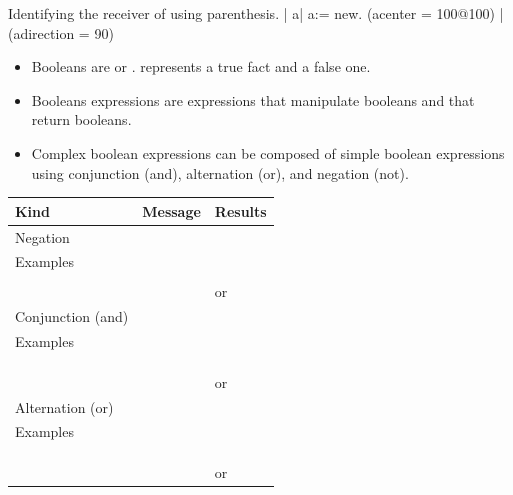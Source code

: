\begin{scriptwithtitle}{Identifying the receiver of \ct{$\mid$} using parenthesis.}\label{src:goodalternative}
| a\Turtle |
a\Turtle := \Turtle new.
(a\Turtle center = 100@100) | (a\Turtle direction = 90)
\end{scriptwithtitle}




\summa

\begin{itemize}
\item 
Booleans are  or .  represents a true fact and  a false one.

\item Booleans expressions are expressions that manipulate booleans and that return booleans. 

\item Complex boolean expressions can be composed of simple boolean expressions using conjunction (and), alternation (or), and negation (not). 
\end{itemize}

\begin{center}
\begin{tabular}{| p{2cm}|p{10cm} | p{2cm}|} \hline
Kind& Message&Results \\ \hline \hline

Negation&\ct{not }&\\ \hline
Examples&\ct{false not}&\ct{true}\\ \hline
&\ct{true not}& \ct{false}\\ \hline
&\ct{(a\Turtle color = Color red) not}&\ct{true} or \ct{false}\\ \hline \hline

Conjunction (and) &\ct{\&}&\\ \hline
Examples&\ct{true \& true}&\ct{true}\\  \hline
&\ct{false \& true}&\ct{false}\\  \hline
&\ct{true \& false}&\ct{false}\\  \hline
&\ct{false \& false}&\ct{false}\\ \hline
&\ct{(a\Turtle center = 100@100) \& (a\Turtle direction = 90)}&\ct{true} or \ct{false}\\ \hline \hline

Alternation (or) &\ct{$\mid$}&\\ \hline
Examples&\ct{true $\mid$ true}&\ct{true}\\ \hline
&\ct{false $\mid$ true}&\ct{true}\\\hline
&\ct{true $\mid$ false}&\ct{true}\\ \hline
&\ct{false $\mid$ false}&\ct{false}\\ \hline
&\ct{Time now > (Time new hours: 8) $\mid$  (Date today  weekday asString = 'Sunday')}&\ct{true} or \ct{false}\\ \hline \hline
\end{tabular}
\end{center}


\ifx\wholebook\relax\else\fi





